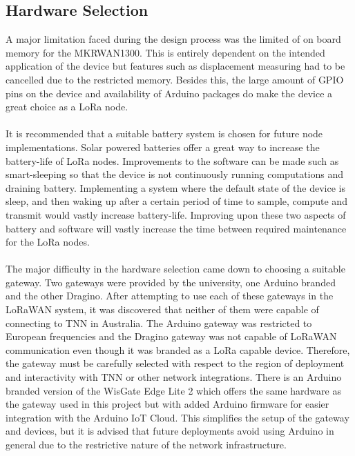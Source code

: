 \subsection{Hardware Selection}
A major limitation faced during the design process was the limited of on board memory for the MKRWAN1300. This is entirely dependent on the intended application of the device but features such as displacement measuring had to be cancelled due to the restricted memory. Besides this, the large amount of GPIO pins on the device and availability of Arduino packages do make the device a great choice as a LoRa node.\\\\
It is recommended that a suitable battery system is chosen for future node implementations. Solar powered batteries offer a great way to increase the battery-life of LoRa nodes. Improvements to the software can be made such as smart-sleeping so that the device is not continuously running computations and draining battery. Implementing a system where the default state of the device is sleep, and then waking up after a certain period of time to sample, compute and transmit would vastly increase battery-life. Improving upon these two aspects of battery and software will vastly increase the time between required maintenance for the LoRa nodes.\\\\
The major difficulty in the hardware selection came down to choosing a suitable gateway. Two gateways were provided by the university, one Arduino branded and the other Dragino. After attempting to use each of these gateways in the LoRaWAN system, it was discovered that neither of them were capable of connecting to TNN in Australia. The Arduino gateway was restricted to European frequencies and the Dragino gateway was not capable of LoRaWAN communication even though it was branded as a LoRa capable device. Therefore, the gateway must be carefully selected with respect to the region of deployment and interactivity with TNN or other network integrations. There is an Arduino branded version of the WisGate Edge Lite 2 which offers the same hardware as the gateway used in this project but with added Arduino firmware for easier integration with the Arduino IoT Cloud. This simplifies the setup of the gateway and devices, but it is advised that future deployments avoid using Arduino in general due to the restrictive nature of the network infrastructure. 

